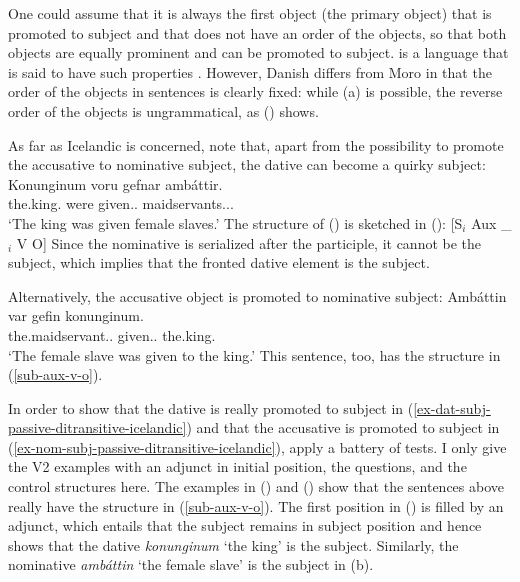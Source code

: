 \noindent
One could assume that it is always the first object (the primary object) that is promoted to subject
and that  does not have an order of the objects, so that both objects are equally prominent
and can be promoted to subject.  is a language that is said to have such properties
\citep{AMM2017a-u}. However, Danish differs from Moro in that the order of the objects in sentences is
clearly fixed: while (a) is possible, the reverse order of the objects is ungrammatical, as
() shows.
\z


\noindent
As far as Icelandic is concerned, \citet*[]{ZMT85a} note that, apart from the possibility to
promote the accusative to nominative subject, the dative can become a quirky subject:
\ea
\label{ex-dat-subj-passive-ditransitive-icelandic}
\gll Konunginum voru gefnar ambáttir.\\
     the.king.\DAT{} were given.\F.\PL{} maidservants.\NOM.\F.\PL\\\icelandic
\glt `The king was given female slaves.'
\z
The structure of () is sketched in ():
\ea
\label{sub-aux-v-o}
{}[S$_i$ Aux \_$_i$ V O] 
\z
Since the nominative is serialized after the participle, it cannot be the subject, which implies that
the fronted dative element is the subject.

Alternatively, the accusative object is promoted to nominative subject:
\ea
\label{ex-nom-subj-passive-ditransitive-icelandic}
\gll Ambáttin var gefin konunginum.\\
     the.maidservant.\NOM.\SG{}  \AUX{} given.\F.\SG{} the.king.\DAT\\\icelandic
\glt `The female slave was given to the king.'
\z
This sentence, too, has the structure in (\ref{sub-aux-v-o}).

In order to show that the dative is really promoted to subject in
(\ref{ex-dat-subj-passive-ditransitive-icelandic}) and that the accusative is promoted to subject in
(\ref{ex-nom-subj-passive-ditransitive-icelandic}), \citet*[]{ZMT85a} apply a battery of
tests. I only give the V2 examples with an adjunct in initial position, the questions, and the
control structures here. The examples in () and () show that the sentences above
really have the structure in (\ref{sub-aux-v-o}). The first position in () is filled by an
adjunct, which entails that the subject remains in subject position and hence shows that the dative
\emph{konunginum} `the king' is the subject. Similarly, the nominative \emph{ambáttin} `the female
slave' is the subject in (b).

